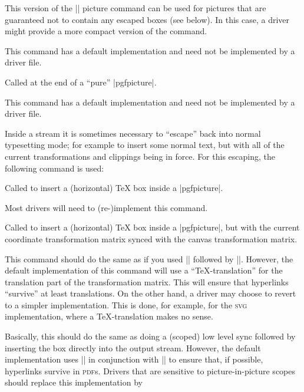 \begin{command}{\pgfsys@beginpurepicture}
    This version of the |\pgfsys@beginpicture| picture command can be used for
    pictures that are guaranteed not to contain any escaped boxes (see below).
    In this case, a driver might provide a more compact version of the command.

    This command has a default implementation and need not be implemented by a
    driver file.
\end{command}

\begin{command}{\pgfsys@endpurepicture}
    Called at the end of a ``pure'' |{pgfpicture}|.

    This command has a default implementation and need not be implemented by a
    driver file.
\end{command}

Inside a stream it is sometimes necessary to ``escape'' back into normal
typesetting mode; for example to insert some normal text, but with all of the
current transformations and clippings being in force. For this escaping, the
following command is used:

\begin{command}{\pgfsys@hbox{}}
    Called to insert a (horizontal) TeX box inside a |{pgfpicture}|.

    Most drivers will need to (re-)implement this command.
\end{command}

\begin{command}{\pgfsys@hboxsynced{}}
    Called to insert a (horizontal) TeX box inside a |{pgfpicture}|, but with
    the current coordinate transformation matrix synced with the canvas
    transformation matrix.

    This command should do the same as if you used |\pgflowlevelsynccm|
    followed by |\pgfsys@hbox|. However, the default implementation of this
    command will use a ``TeX-translation'' for the translation part of the
    transformation matrix. This will ensure that hyperlinks ``survive'' at
    least translations. On the other hand, a driver may choose to revert to a
    simpler implementation. This is done, for example, for the \textsc{svg}
    implementation, where a \TeX-translation makes no sense.
\end{command}

\begin{command}{\pgfsys@pictureboxsynced{}}
    Basically, this should do the same as doing a (scoped) low level sync
    followed by inserting the box  directly into the output
    stream. However, the default implementation uses |\pgfsys@hboxsynced| in
    conjunction with |\pgfsys@beginpicture| to ensure that, if possible,
    hyperlinks survive in \textsc{pdf}s. Drivers that are sensitive to
    picture-in-picture scopes should replace this implementation by
\end{command}


